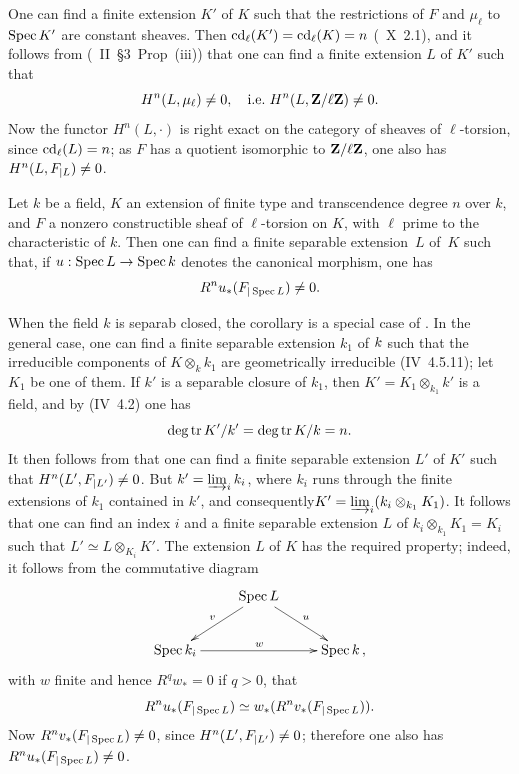 One can find a finite extension $K'$ of $K$ such that the restrictions of $F$ and $\mu_\ell$ to $\Spec K'$ are constant sheaves. Then $\cd_{\ell}(K') = \cd_{\ell}(K) = n$ (~X~2.1), and it follows from (\cite{XIV.2}~II~\S 3~Prop~\textup{(iii)}) that one can find a finite extension $L$ of $K'$ such that\pageoriginale
$$
H^n(L, \mu_{\ell})\neq 0, \quad\text {\ie } H^n(L, \ZZ/\ell\ZZ) \neq 0.
$$
Now the functor $H^n(L,\cdot)$ is right exact on the category of sheaves of $\ell$-torsion, since $\cd_{\ell}(L)=n$; as $F$ has a quotient isomorphic to $\ZZ/\ell\ZZ$, one also has $H^n(L, \sisi{F{|L}}{F_{|L}}) \neq 0$.

\begin{corollaire} \label{XIV.3.3}
Let $k$ be a field, $K$ an extension of finite type and transcendence degree $n$ over $k$, and $F$ a nonzero constructible sheaf of $\ell$-torsion on $K$, with $\ell$ prime to the characteristic of $k$. Then one can find a finite separable extension~$L$ of~$K$ such that, if $u: \Spec L \to \Spec k$ denotes the canonical morphism, one has
$$R^n u_*(\sisi{F{|\Spec L}}{F_{|\Spec L}}) \neq 0.
$$
\end{corollaire}

When the field $k$ is separab closed, the corollary is a special case of . In the general case, one can find a finite separable extension $k_1$ of $k\sisi{'}{}$ such that the irreducible components of $K \otimes_k k_1$ are geometrically irreducible (\EGA IV~4.5.11); let $K_1$ be one of them. If $k'$ is a separable closure of $k_1$, then $K' = K_1 \otimes_{k_1} k'$ is a field, and by (\EGA IV~4.2) one has
$$
\deg \tr K'/k' = \deg \tr K/k = n.
$$
It then follows from  that one can find a finite separable extension $L'$ of $K'$ such that $H^n(L', \sisi{F{|L'}}{F_{|L'}}) \neq 0$. But $k' = \varinjlim_i k_i$, where $k_i$ runs through the finite extensions of $k_1$ contained in $k'$, and consequently\pageoriginale $K' = \varinjlim_i (k_i \otimes_{k_1} K_1)$. It follows that one can find an index $i$ and a finite separable extension $L$ of $k_i \otimes_{k_1} K_1 =K_i$ such that $L' \simeq L \otimes_{K_i} K'$. The extension $L$ of $K$ has the required property; indeed, it follows from the commutative diagram
$$
\xymatrix{
&{\Spec L}\ar[dl]_v\ar[dr]^u&\\
{\Spec k_i} \ar[rr]^w &{}&{\Spec k}\,,
}
$$
with $w$ finite and hence $R^q w_* = 0$ if $q>0$, that
$$R^n u_*(\sisi{F{|\Spec L}}{F_{|\Spec L}}) \simeq w_*(R^n v_*(\sisi{F{|\Spec L}}{F_{|\Spec L}})).
$$
Now $R^nv_*(\sisi{F{|\Spec L}}{F_{|\Spec L}}) \neq 0$, since $H^n(L', \sisi{F{|L'}}{F_{|L'}}) \neq 0$; therefore one also has $R^nu_*(\sisi{F{|\Spec L}}{F_{|\Spec L}}) \neq 0$.


